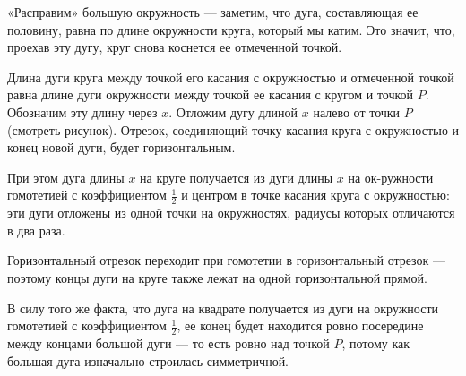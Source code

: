 ﻿
\begin{itemize}
\itA «Расправим» большую окружность — заметим, что дуга, составляющая ее половину, равна по длине окружности круга, который мы катим. Это значит, что, проехав эту дугу, круг снова коснется ее отмеченной точкой.

\begin{center}
\end{center}

\itB Длина дуги круга между точкой его касания с окружностью и отмеченной точкой равна длине дуги окружности между точкой ее касания с кругом и точкой $P$. Обозначим эту длину через $x$. Отложим дугу длиной $x$ налево от точки $P$ (смотреть рисунок). Отрезок, соединяющий точку касания круга с окружностью и конец новой дуги, будет горизонтальным.

При этом дуга длины $x$ на круге получается из дуги длины $x$ на ок-\linebreak ружности гомотетией с коэффициентом $\tfrac{1}{2}$ и центром в точке касания круга с окружностью: эти дуги отложены из одной точки на окружностях, радиусы которых отличаются в два раза.

Горизонтальный отрезок переходит при гомотетии в горизонтальный отрезок — поэтому концы дуги на круге также лежат на одной горизонтальной прямой.

\itC В силу того же факта, что дуга на квадрате получается из дуги на окружности гомотетией с коэффициентом $\tfrac{1}{2}$, ее конец будет находится ровно посередине между концами большой дуги — то есть ровно над точкой $P$, потому как большая дуга изначально строилась симметричной.
\end{itemize}